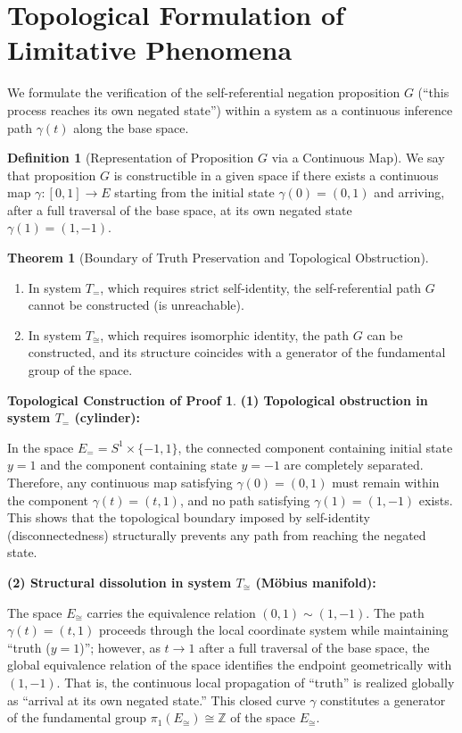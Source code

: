 \documentclass[11pt,a4paper]{article}
\theoremstyle{definition}
\newtheorem{definition}{Definition}[section]
\newtheorem{theorem}{Theorem}[section]
\newtheorem{proof_topological}{Topological Construction of Proof}
\begin{document}
\section{Topological Formulation of Limitative Phenomena}

We formulate the verification of the self-referential negation proposition $G$ (``this process reaches its own negated state'') within a system as a continuous inference path $\gamma(t)$ along the base space.

\begin{definition}[Representation of Proposition $G$ via a Continuous Map]
We say that proposition $G$ is constructible in a given space if there exists a continuous map $\gamma: [0, 1] \to E$ starting from the initial state $\gamma(0) = (0, 1)$ and arriving, after a full traversal of the base space, at its own negated state $\gamma(1) = (1, -1)$.
\end{definition}

\begin{theorem}[Boundary of Truth Preservation and Topological Obstruction]
\label{thm:mobius_incompleteness}
\begin{enumerate}
\item[(1)] In system $T_{=}$, which requires strict self-identity, the self-referential path $G$ cannot be constructed (is unreachable).
\item[(2)] In system $T_{\cong}$, which requires isomorphic identity, the path $G$ can be constructed, and its structure coincides with a generator of the fundamental group of the space.
\end{enumerate}
\end{theorem}

\begin{proof_topological}
\textbf{(1) Topological obstruction in system $T_{=}$ (cylinder):}

In the space $E_{=} = S^1 \times \{-1, 1\}$, the connected component containing initial state $y = 1$ and the component containing state $y = -1$ are completely separated. Therefore, any continuous map satisfying $\gamma(0) = (0, 1)$ must remain within the component $\gamma(t) = (t, 1)$, and no path satisfying $\gamma(1) = (1, -1)$ exists. This shows that the topological boundary imposed by self-identity (disconnectedness) structurally prevents any path from reaching the negated state.

\textbf{(2) Structural dissolution in system $T_{\cong}$ (M\"{o}bius manifold):}

The space $E_{\cong}$ carries the equivalence relation $(0, 1) \sim (1, -1)$. The path $\gamma(t) = (t, 1)$ proceeds through the local coordinate system while maintaining ``truth ($y = 1$)''; however, as $t \to 1$ after a full traversal of the base space, the global equivalence relation of the space identifies the endpoint geometrically with $(1, -1)$. That is, the continuous local propagation of ``truth'' is realized globally as ``arrival at its own negated state.'' This closed curve $\gamma$ constitutes a generator of the fundamental group $\pi_1(E_{\cong}) \cong \mathbb{Z}$ of the space $E_{\cong}$.
\end{proof_topological}
\end{document}
